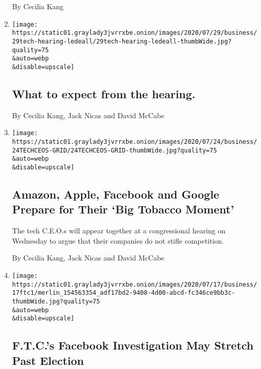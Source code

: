 \begin{enumerate}
  By Cecilia Kang
\item
  \href{/live/2020/07/29/technology/tech-ceos-hearing-testimony/what-to-expect-from-the-hearing}{}

  \texttt{[image: https://static01.graylady3jvrrxbe.onion/images/2020/07/29/business/29tech-hearing-ledeall/29tech-hearing-ledeall-thumbWide.jpg?quality=75\\\&auto=webp\\\&disable=upscale]}

  \hypertarget{what-to-expect-from-the-hearing}{%
  \subsection{What to expect from the
  hearing.}\label{what-to-expect-from-the-hearing}}

  By Cecilia Kang, Jack Nicas and David McCabe
\item
  \href{/2020/07/28/technology/amazon-apple-facebook-google-antitrust-hearing.html}{}

  \texttt{[image: https://static01.graylady3jvrrxbe.onion/images/2020/07/24/business/24TECHCEOS-GRID/24TECHCEOS-GRID-thumbWide.jpg?quality=75\\\&auto=webp\\\&disable=upscale]}

  \hypertarget{amazon-apple-facebook-and-google-prepare-for-their-big-tobacco-moment}{%
  \subsection{Amazon, Apple, Facebook and Google Prepare for Their `Big
  Tobacco
  Moment'}\label{amazon-apple-facebook-and-google-prepare-for-their-big-tobacco-moment}}

  The tech C.E.O.s will appear together at a congressional hearing on
  Wednesday to argue that their companies do not stifle competition.

  By Cecilia Kang, Jack Nicas and David McCabe
\item
  \href{/2020/07/17/technology/ftc-facebook-investigation.html}{}

  \texttt{[image: https://static01.graylady3jvrrxbe.onion/images/2020/07/17/business/17ftc1/merlin\_154563354\_adf17bd2-9408-4d00-abcd-fc346ce9bb3c-thumbWide.jpg?quality=75\\\&auto=webp\\\&disable=upscale]}

  \hypertarget{ftcs-facebook-investigation-may-stretch-past-election}{%
  \subsection{F.T.C.'s Facebook Investigation May Stretch Past
  Election}\label{ftcs-facebook-investigation-may-stretch-past-election}}


\end{enumerate}
